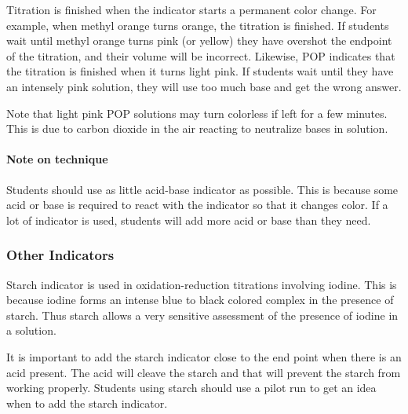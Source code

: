 Titration is finished when the indicator starts a permanent color change. For example, when methyl orange turns orange, the titration is finished. If students wait until methyl orange turns pink (or yellow) they have overshot the endpoint of the titration, and their volume will be incorrect. Likewise, POP indicates that the titration is finished when it turns light pink. If students wait until they have an intensely pink solution, they will use too much base and get the wrong answer. 

Note that light pink POP solutions may turn colorless if left for a few minutes. This is due to carbon dioxide in the air reacting to neutralize bases in solution.

\paragraph{Note on technique}
Students should use as little acid-base indicator as possible. This is because some acid or base is required to react with the indicator so that it changes color. If a lot of indicator is used, students will add more acid or base than they need.

\subsubsection{Other Indicators}
Starch indicator is used in oxidation-reduction titrations involving iodine. This is because iodine forms an intense blue to black colored complex in the presence of starch. Thus starch allows a very sensitive assessment of the presence of iodine in a solution.

It is important to add the starch indicator close to the end point when there is an acid present. The acid will cleave the starch and that will prevent the starch from working properly. Students using starch should use a pilot run to get an idea when to add the starch indicator.

